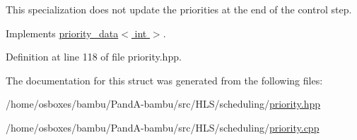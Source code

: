 This specialization does not update the priorities at the end of the control step. 



Implements \hyperlink{structpriority__data_a3cd70f3b6d8e300615ad91fd85291c76}{priority\+\_\+data$<$ int $>$}.



Definition at line 118 of file priority.\+hpp.



The documentation for this struct was generated from the following files\+:\begin{DoxyCompactItemize}
\item 
/home/osboxes/bambu/\+Pand\+A-\/bambu/src/\+H\+L\+S/scheduling/\hyperlink{priority_8hpp}{priority.\+hpp}\item 
/home/osboxes/bambu/\+Pand\+A-\/bambu/src/\+H\+L\+S/scheduling/\hyperlink{priority_8cpp}{priority.\+cpp}\end{DoxyCompactItemize}
